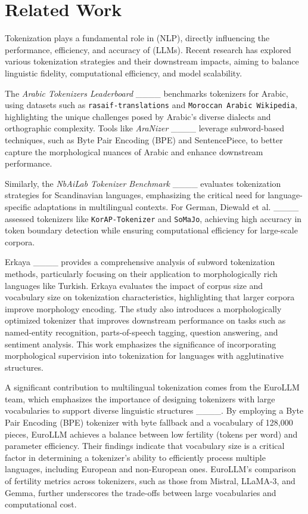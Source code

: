 \section{Related Work}
Tokenization plays a fundamental role in (NLP), directly influencing the performance, efficiency, and accuracy of (LLMs). Recent research has explored various tokenization strategies and their downstream impacts, aiming to balance linguistic fidelity, computational efficiency, and model scalability.

The \textit{Arabic Tokenizers Leaderboard} ____ benchmarks tokenizers for Arabic, using datasets such as \texttt{rasaif-translations} and \texttt{Moroccan Arabic Wikipedia}, highlighting the unique challenges posed by Arabic's diverse dialects and orthographic complexity. Tools like \textit{AraNizer} ____ leverage subword-based techniques, such as Byte Pair Encoding (BPE) and SentencePiece, to better capture the morphological nuances of Arabic and enhance downstream performance.

Similarly, the \textit{NbAiLab Tokenizer Benchmark} ____ evaluates tokenization strategies for Scandinavian languages, emphasizing the critical need for language-specific adaptations in multilingual contexts. For German, Diewald et al. ____ assessed tokenizers like \texttt{KorAP-Tokenizer} and \texttt{SoMaJo}, achieving high accuracy in token boundary detection while ensuring computational efficiency for large-scale corpora.

Erkaya ____ provides a comprehensive analysis of subword tokenization methods, particularly focusing on their application to morphologically rich languages like Turkish. Erkaya evaluates the impact of corpus size and vocabulary size on tokenization characteristics, highlighting that larger corpora improve morphology encoding. The study also introduces a morphologically optimized tokenizer that improves downstream performance on tasks such as named-entity recognition, parts-of-speech tagging, question answering, and sentiment analysis. This work emphasizes the significance of incorporating morphological supervision into tokenization for languages with agglutinative structures.

A significant contribution to multilingual tokenization comes from the EuroLLM team, which emphasizes the importance of designing tokenizers with large vocabularies to support diverse linguistic structures ____. By employing a Byte Pair Encoding (BPE) tokenizer with byte fallback and a vocabulary of 128,000 pieces, EuroLLM achieves a balance between low fertility (tokens per word) and parameter efficiency. Their findings indicate that vocabulary size is a critical factor in determining a tokenizer’s ability to efficiently process multiple languages, including European and non-European ones. EuroLLM's comparison of fertility metrics across tokenizers, such as those from Mistral, LLaMA-3, and Gemma, further underscores the trade-offs between large vocabularies and computational cost.

